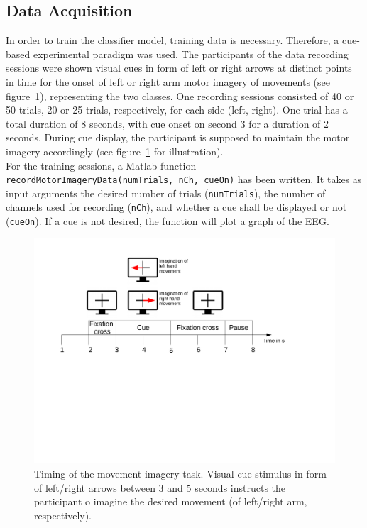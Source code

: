 \documentclass[a4paper,oneside, openright,12pt]{report}
\begin{document}
\subsection{Data Acquisition}
In order to train the classifier model, training data is necessary. Therefore, a cue-based experimental paradigm was used. The participants of the data recording sessions were shown visual cues in form of left or right arrows at distinct points in time for the onset of left or right arm motor imagery of movements (see figure~\ref{fig:exp_design}), representing the two classes. One recording sessions consisted of 40 or 50 trials, 20 or 25 trials, respectively, for each side (left, right). One trial has a total duration of 8 seconds, with cue onset on second 3 for a duration of 2 seconds. During cue display, the participant is supposed to maintain the motor imagery accordingly (see figure~\ref{fig:exp_design} for illustration).\\
For the training sessions, a Matlab function \texttt{recordMotorImageryData(numTrials, nCh, cueOn)} has been written. It takes as input arguments the desired number of trials (\texttt{numTrials}), the number of channels used for recording (\texttt{nCh}), and whether a cue shall be displayed or not (\texttt{cueOn}). If a cue is not desired, the function will plot a graph of the EEG. 
\begin{figure}[htbp!]
	\centering
	\includegraphics[width=1\linewidth]{./gfx/exp_design}
	\caption{Timing of the movement imagery task. Visual cue stimulus in form of left/right arrows between 3 and 5 seconds instructs the participant o imagine the desired movement (of left/right arm, respectively).}
	\label{fig:exp_design}
\end{figure}
\end{document}
